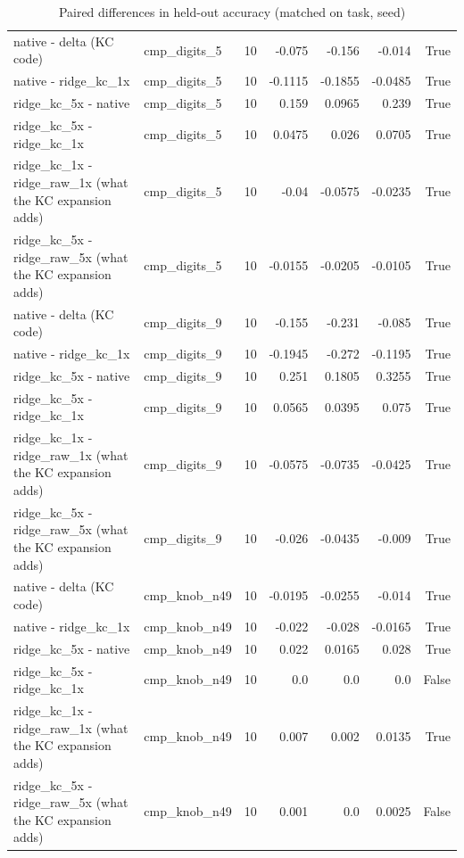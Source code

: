 \begin{table}[t]
\begin{tabular}{llrrrrr}
native - delta (KC code) & cmp\_digits\_5 & 10 & -0.075 & -0.156 & -0.014 & True \\
native - ridge\_kc\_1x & cmp\_digits\_5 & 10 & -0.1115 & -0.1855 & -0.0485 & True \\
ridge\_kc\_5x - native & cmp\_digits\_5 & 10 & 0.159 & 0.0965 & 0.239 & True \\
ridge\_kc\_5x - ridge\_kc\_1x & cmp\_digits\_5 & 10 & 0.0475 & 0.026 & 0.0705 & True \\
ridge\_kc\_1x - ridge\_raw\_1x (what the KC expansion adds) & cmp\_digits\_5 & 10 & -0.04 & -0.0575 & -0.0235 & True \\
ridge\_kc\_5x - ridge\_raw\_5x (what the KC expansion adds) & cmp\_digits\_5 & 10 & -0.0155 & -0.0205 & -0.0105 & True \\
native - delta (KC code) & cmp\_digits\_9 & 10 & -0.155 & -0.231 & -0.085 & True \\
native - ridge\_kc\_1x & cmp\_digits\_9 & 10 & -0.1945 & -0.272 & -0.1195 & True \\
ridge\_kc\_5x - native & cmp\_digits\_9 & 10 & 0.251 & 0.1805 & 0.3255 & True \\
ridge\_kc\_5x - ridge\_kc\_1x & cmp\_digits\_9 & 10 & 0.0565 & 0.0395 & 0.075 & True \\
ridge\_kc\_1x - ridge\_raw\_1x (what the KC expansion adds) & cmp\_digits\_9 & 10 & -0.0575 & -0.0735 & -0.0425 & True \\
ridge\_kc\_5x - ridge\_raw\_5x (what the KC expansion adds) & cmp\_digits\_9 & 10 & -0.026 & -0.0435 & -0.009 & True \\
native - delta (KC code) & cmp\_knob\_n49 & 10 & -0.0195 & -0.0255 & -0.014 & True \\
native - ridge\_kc\_1x & cmp\_knob\_n49 & 10 & -0.022 & -0.028 & -0.0165 & True \\
ridge\_kc\_5x - native & cmp\_knob\_n49 & 10 & 0.022 & 0.0165 & 0.028 & True \\
ridge\_kc\_5x - ridge\_kc\_1x & cmp\_knob\_n49 & 10 & 0.0 & 0.0 & 0.0 & False \\
ridge\_kc\_1x - ridge\_raw\_1x (what the KC expansion adds) & cmp\_knob\_n49 & 10 & 0.007 & 0.002 & 0.0135 & True \\
ridge\_kc\_5x - ridge\_raw\_5x (what the KC expansion adds) & cmp\_knob\_n49 & 10 & 0.001 & 0.0 & 0.0025 & False \\
\bottomrule
\end{tabular}
\caption{Paired differences in held-out accuracy (matched on task, seed)}
\label{tab:readouts_paired}
\end{table}